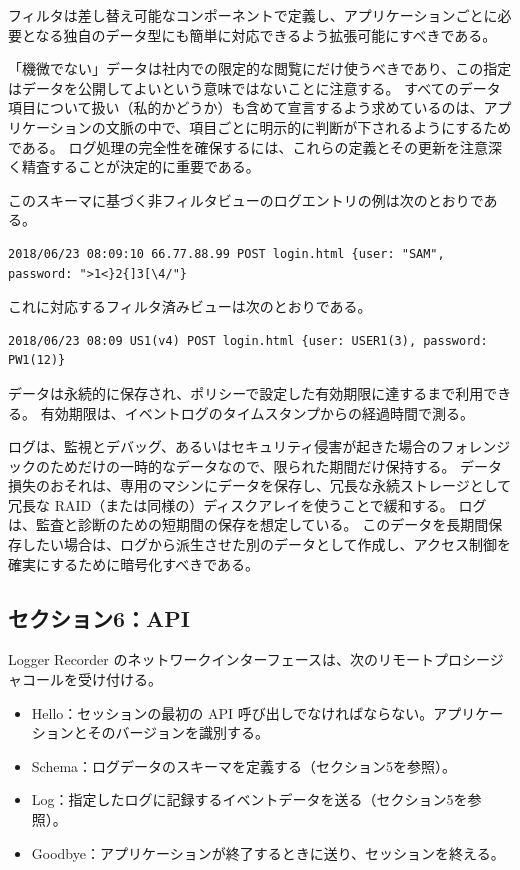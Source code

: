 \documentclass[uplatex]{jsarticle}
\def\label#1{}%
\begin{document}
フィルタは差し替え可能なコンポーネントで定義し、アプリケーションごとに必要となる独自のデータ型にも簡単に対応できるよう拡張可能にすべきである。

\begin{rem}\label{rem:appa-nonsensitive}
「機微でない」データは社内での限定的な閲覧にだけ使うべきであり、この指定はデータを公開してよいという意味ではないことに注意する。
すべてのデータ項目について扱い（私的かどうか）も含めて宣言するよう求めているのは、アプリケーションの文脈の中で、項目ごとに明示的に判断が下されるようにするためである。
ログ処理の完全性を確保するには、これらの定義とその更新を注意深く精査することが決定的に重要である。
\end{rem}

\begin{exa}[非フィルタビューとフィルタ済みビューのログエントリ]\label{exa:appa-filtered-entry}
このスキーマに基づく非フィルタビューのログエントリの例は次のとおりである。
{\footnotesize
\begin{verbatim}
2018/06/23 08:09:10 66.77.88.99 POST login.html {user: "SAM", password: ">1<}2{]3[\4/"}
\end{verbatim}
}
これに対応するフィルタ済みビューは次のとおりである。
\begin{verbatim}
2018/06/23 08:09 US1(v4) POST login.html {user: USER1(3), password: PW1(12)}
\end{verbatim}
\end{exa}

データは永続的に保存され、ポリシーで設定した有効期限に達するまで利用できる。
有効期限は、イベントログのタイムスタンプからの経過時間で測る。

ログは、監視とデバッグ、あるいはセキュリティ侵害が起きた場合のフォレンジックのためだけの一時的なデータなので、限られた期間だけ保持する。
データ損失のおそれは、専用のマシンにデータを保存し、冗長な永続ストレージとして冗長な RAID（または同様の）ディスクアレイを使うことで緩和する。
ログは、監査と診断のための短期間の保存を想定している。
このデータを長期間保存したい場合は、ログから派生させた別のデータとして作成し、アクセス制御を確実にするために暗号化すべきである。

\subsection{セクション6：API}

Logger Recorder のネットワークインターフェースは、次のリモートプロシージャコールを受け付ける。
\begin{itemize}
\item Hello：セッションの最初の API 呼び出しでなければならない。アプリケーションとそのバージョンを識別する。
\item Schema：ログデータのスキーマを定義する（セクション5を参照）。
\item Log：指定したログに記録するイベントデータを送る（セクション5を参照）。
\item Goodbye：アプリケーションが終了するときに送り、セッションを終える。
\end{itemize}
\end{document}
